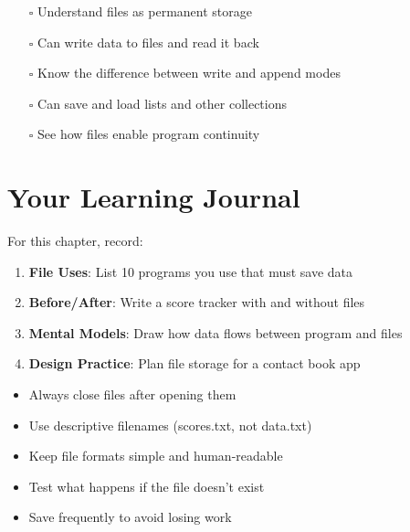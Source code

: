 \documentclass[
  letterpaper,
  DIV=11,
  numbers=noendperiod,
  oneside]{scrreprt}
\providecommand{\tightlist}{%
  \setlength{\itemsep}{0pt}\setlength{\parskip}{0pt}}\usepackage{longtable,booktabs,array}
\begin{document}
\begin{itemize}
\tightlist
\item[$\square$]
  Understand files as permanent storage
\item[$\square$]
  Can write data to files and read it back
\item[$\square$]
  Know the difference between write and append modes
\item[$\square$]
  Can save and load lists and other collections
\item[$\square$]
  See how files enable program continuity
\end{itemize}

\section{Your Learning Journal}\label{your-learning-journal-8}

For this chapter, record:

\begin{enumerate}
\def\labelenumi{\arabic{enumi}.}
\tightlist
\item
  \textbf{File Uses}: List 10 programs you use that must save data
\item
  \textbf{Before/After}: Write a score tracker with and without files
\item
  \textbf{Mental Models}: Draw how data flows between program and files
\item
  \textbf{Design Practice}: Plan file storage for a contact book app
\end{enumerate}

\begin{tcolorbox}[enhanced jigsaw, opacityback=0, colback=white, colframe=quarto-callout-tip-color-frame, breakable, titlerule=0mm, coltitle=black, rightrule=.15mm, colbacktitle=quarto-callout-tip-color!10!white, left=2mm, bottomtitle=1mm, bottomrule=.15mm, title=\textcolor{quarto-callout-tip-color}{\faLightbulb}\hspace{0.5em}{File Best Practices}, opacitybacktitle=0.6, toptitle=1mm, leftrule=.75mm, arc=.35mm, toprule=.15mm]

\begin{itemize}
\tightlist
\item
  Always close files after opening them
\item
  Use descriptive filenames (scores.txt, not data.txt)
\item
  Keep file formats simple and human-readable
\item
  Test what happens if the file doesn't exist
\item
  Save frequently to avoid losing work
\end{itemize}

\end{tcolorbox}
\end{document}
